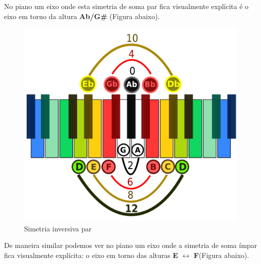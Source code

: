 \documentclass[
	12pt,				%
	openright,			%
	twoside,			%
	a4paper,			%
	english,			%
	french,				%
	spanish,			%
	brazil				%
	]{abntex2}
\begin{document}
No piano um eixo onde esta simetria de soma par fica visualmente explícita é o eixo em torno da altura \textbf{Ab/G\#} (Figura abaixo).

\begin{figure}[!h]
	\caption{\label{fig_grafico}Simetria inversiva par}
	\begin{center}
	    \includegraphics[scale=0.3]{axis/simetriainversiva_par.pdf}
	\end{center}
\end{figure}

De maneira similar podemos ver no piano um eixo onde a simetria de soma ímpar fica visualmente explícita: o eixo em torno das alturas \textbf{E} $\leftrightarrow $  \textbf{F}(Figura abaixo).
\end{document}
